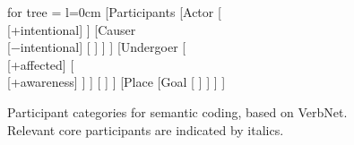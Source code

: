 \begin{figure}
	\small
		\begin{forest}
		for tree = {l=0cm}
			[Participants 
				[Actor
					[\\{[+intentional]}
					]
					[Causer\\{[−intentional]}
						[
						]
					]
				]			
				[Undergoer
					[\\{[+affected]}
						[\\{[+awareness]}
						]
					]
					[
					]
				]
				[Place
					[Goal
						[
						]
					]
				]
			]
		\end{forest}
		\caption[Participant categories for semantic coding]{\label{fig:participants}Participant categories for semantic coding, based on VerbNet. Relevant core participants are indicated by italics.}
\end{figure}

